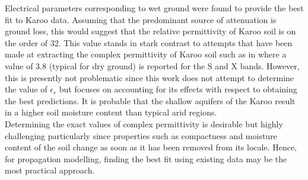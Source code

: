 \documentclass[10pt,journal,twoside]{IEEEtran}
\begin{document}
Electrical parameters corresponding to wet ground were found to provide the best fit to Karoo data. Assuming that the predominant source of attenuation is ground loss, this would suggest that the relative permittivity of Karoo soil is on the order of \num{32}. This value stands in stark contrast to attempts that have been made at extracting the complex permittivity of Karoo soil such as in \cite{Braam2011} where a value of \num{3.8} (typical for dry ground) is reported for the S and X bands. However, this is presently not problematic since this work does not attempt to determine the value of $\epsilon_r$ but focuses on accounting for its effects with respect to obtaining the best predictions. It is probable that the shallow aquifers of the Karoo result in a higher soil moisture content than typical arid regions.\\ %
Determining the exact values of complex permittivity is desirable but highly challenging particularly since properties such as compactness and moisture content of the soil change as soon as it has been removed from its locale. Hence, for propagation modelling, finding the best fit using existing data may be the most practical approach.
%
\end{document}
